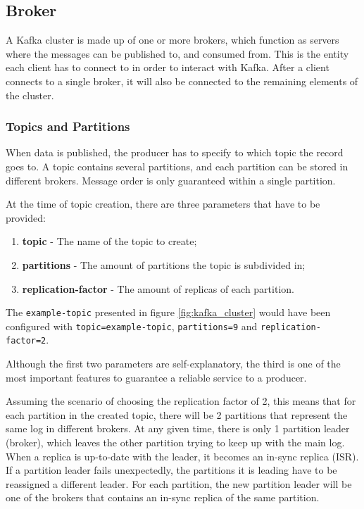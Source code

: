 \subsection{Broker}

A Kafka cluster is made up of one or more brokers, which function as servers
where the messages can be published to, and consumed from. This is the entity
each client has to connect to in order to interact with Kafka. After a client
connects to a single broker, it will also be connected to the remaining elements
of the cluster.

\subsubsection{Topics and Partitions}

When data is published, the producer has to specify to which topic the record
goes to. A topic contains several partitions, and each partition can be stored
in different brokers. Message order is only guaranteed within a single
partition.

At the time of topic creation, there are three parameters that have to be
provided: 
\begin{enumerate}
    \item \textbf{topic} - The name of the topic to create;
    \item \textbf{partitions} - The amount of partitions the topic is subdivided
        in;
    \item \textbf{replication-factor} - The amount of replicas of each partition.
\end{enumerate}
The \lstinline{example-topic} presented in figure \ref{fig:kafka_cluster} would have been
configured with \lstinline{topic=example-topic}, \lstinline{partitions=9} and
\lstinline{replication-factor=2}.

Although the first two parameters are self-explanatory, the third is one of the
most important features to guarantee a reliable service to a producer. 

Assuming the scenario of choosing the replication factor of 2, this means that
for each partition in the created topic, there will be 2 partitions that
represent the same log in different brokers. At any given time, there is only 1
partition leader (broker), which leaves the other partition trying to keep up
with the main log. When a replica is up-to-date with the leader, it becomes an
in-sync replica (ISR). If a partition leader fails unexpectedly, the partitions it is
leading have to be reassigned a different leader. For each partition, the new
partition leader will be one of the brokers that contains an in-sync replica of
the same partition.

